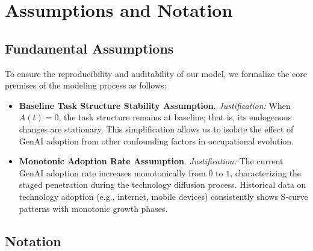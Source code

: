 \section{Assumptions and Notation}
\subsection{Fundamental Assumptions}

To ensure the reproducibility and auditability of our model, we formalize the core premises of the modeling process as follows:

\begin{itemize}[leftmargin=2em, itemsep=0.4em]

\item \textbf{Baseline Task Structure Stability Assumption}. \textit{Justification:} When $A(t)=0$, the task structure remains at baseline; that is, its endogenous changes are stationary. This simplification allows us to isolate the effect of GenAI adoption from other confounding factors in occupational evolution.

\item \textbf{Monotonic Adoption Rate Assumption}. \textit{Justification:} The current GenAI adoption rate increases monotonically from $0$ to $1$, characterizing the staged penetration during the technology diffusion process. Historical data on technology adoption (e.g., internet, mobile devices) consistently shows S-curve patterns with monotonic growth phases.

\end{itemize}

\subsection{Notation}

